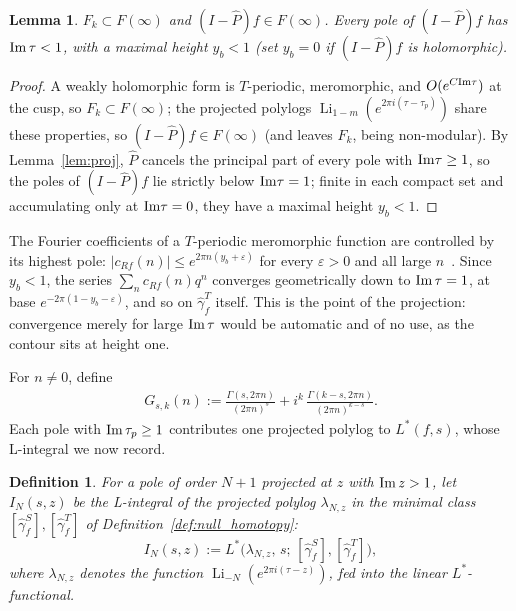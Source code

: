 \documentclass[11pt]{article}
\newtheorem{lemma}[theorem]{Lemma}
\newtheorem{definition}[theorem]{Definition}
\DeclareMathOperator{\Li}{Li}
\begin{document}
\begin{lemma}\label{lem:projspace}
$F_k\subset F(\infty)$ and $(I-\widehat P)f\in F(\infty)$. Every pole of $(I-\widehat P)f$ has
${\rm Im}\,\tau<1$, with a maximal height $y_b<1$ (set $y_b=0$ if $(I-\widehat P)f$ is
holomorphic).
\end{lemma}
\begin{proof}
A weakly holomorphic form is $T$-periodic, meromorphic, and $O(e^{C{\rm Im}\tau})$ at the cusp,
so $F_k\subset F(\infty)$; the projected polylogs $\Li_{1-m}(e^{2\pi i(\tau-\tau_p)})$ share
these properties, so $(I-\widehat P)f\in F(\infty)$ (and leaves $F_k$, being non-modular). By
Lemma~\ref{lem:proj}, $\widehat P$ cancels the principal part of every pole with
${\rm Im}\tau\ge1$, so the poles of $(I-\widehat P)f$ lie strictly below ${\rm Im}\tau=1$;
finite in each compact set and accumulating only at ${\rm Im}\tau=0$, they have a maximal
height $y_b<1$.
\end{proof}

The Fourier coefficients of a $T$-periodic meromorphic function are controlled by its highest pole:
$|c_{Rf}(n)|\le e^{2\pi n(y_b+\varepsilon)}$ for every $\varepsilon>0$ and all large
$n$~\cite{1806}. Since $y_b<1$, the series $\sum_n c_{Rf}(n)q^n$ converges geometrically down to
${\rm Im}\,\tau=1$, at base $e^{-2\pi(1-y_b-\varepsilon)}$, and so on $\hat\gamma^T_f$ itself. This
is the point of the projection: convergence merely for large ${\rm Im}\,\tau$ would be automatic and
of no use, as the contour sits at height one.

For $n\ne0$, define
\begin{align}\label{eq:gc}
G_{s,k}(n):=\frac{\Gamma(s,2\pi n)}{(2\pi n)^s}
+i^k\,\frac{\Gamma(k-s,2\pi n)}{(2\pi n)^{k-s}}.
\end{align}
Each pole with ${\rm Im}\,\tau_p\ge1$ contributes one projected polylog to $L^*(f,s)$, whose
L-integral we now record.

\begin{definition}\label{def:IN}
For a pole of order $N+1$ projected at $z$ with ${\rm Im}\,z>1$, let $I_N(s,z)$ be the L-integral of the
projected polylog $\lambda_{N,z}$ in the minimal class $[\hat\gamma_f^S],[\hat\gamma_f^T]$
of Definition~\ref{def:null_homotopy}:
\begin{equation}\label{eq:IN}
I_N(s,z):=L^*\big(\lambda_{N,z},\,s;\,[\hat\gamma_f^S],[\hat\gamma_f^T]\big),
\end{equation}
where $\lambda_{N,z}$ denotes the function $\Li_{-N}(e^{2\pi i(\tau-z)})$, fed into the linear
$L^*$-functional.
\end{definition}
\end{document}
